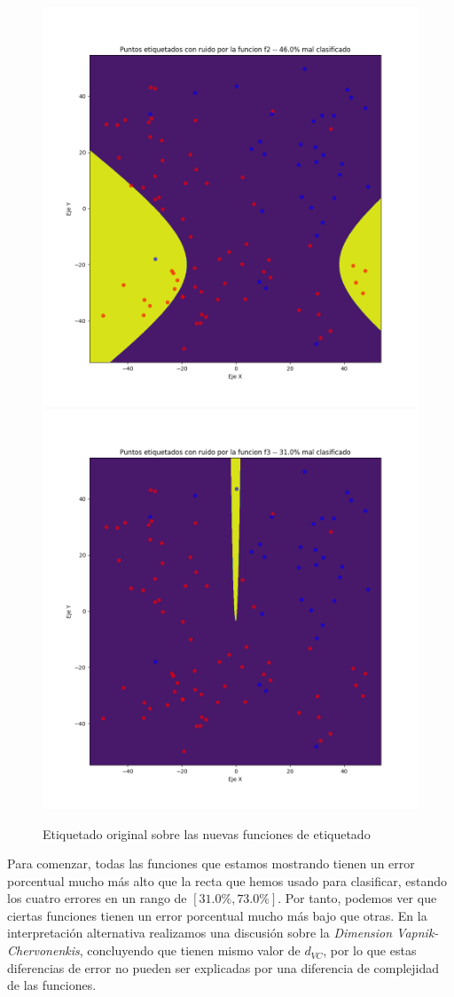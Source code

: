 \documentclass[11pt]{article}
\begin{document}
\begin{figure}[H]
    \includegraphics[width=0.60 \textwidth]{puntos_clasificados_f2.png}
    \includegraphics[width=0.60 \textwidth]{puntos_clasificados_f3.png}

    \caption{Etiquetado original sobre las nuevas funciones de etiquetado}
\end{figure}


Para comenzar, todas las funciones que estamos mostrando tienen un error porcentual mucho más alto que la recta que hemos usado para clasificar, estando los cuatro errores en un rango de $[31.0\%, 73.0\%]$. Por tanto, podemos ver que ciertas funciones tienen un error porcentual mucho más bajo que otras. En la interpretación alternativa realizamos una discusión sobre la \emph{Dimension Vapnik-Chervonenkis}, concluyendo que tienen mismo valor de $d_{VC}$, por lo que estas diferencias de error no pueden ser explicadas por una diferencia de complejidad de las funciones.
\end{document}
